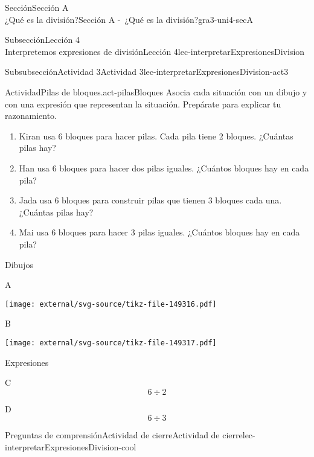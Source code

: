 \begin{sectionptx}{Sección}{{\Large Sección A\\}¿Qué es la división?}{}{Sección A -~¿Qué es la división?}{}{}{gra3-uni4-secA}
\begin{subsectionptx}{Subsección}{{\normalsize Lección 4\\[-0.05cm]}Interpretemos expresiones de división}{}{Lección 4}{}{}{lec-interpretarExpresionesDivision}
\begin{subsubsectionptx}{Subsubsección}{Actividad 3}{}{Actividad 3}{}{}{lec-interpretarExpresionesDivision-act3}
\begin{activity}{Actividad}{Pilas de bloques.}{act-pilasBloques}
Asocia cada situación con un dibujo y con una expresión que representan la situación. Prepárate para explicar tu razonamiento.%
%
\begin{enumerate}
\item{}Kiran usa 6 bloques para hacer pilas. Cada pila tiene 2 bloques. ¿Cuántas pilas hay?%
\item{}Han usa 6 bloques para hacer dos pilas iguales. ¿Cuántos bloques hay en cada pila?%
\item{}Jada usa 6 bloques para construir pilas que tienen 3 bloques cada una. ¿Cuántas pilas hay?%
\item{}Mai usa 6 bloques para hacer 3 pilas iguales. ¿Cuántos bloques hay en cada pila?%
\end{enumerate}
Dibujos%
\begin{sidebyside}{2}{0.05}{0.05}{0.1}%
\begin{sbspanel}{0.4}%
A%
\par
\texttt{[image: external/svg-source/tikz-file-149316.pdf]}
\end{sbspanel}%
\begin{sbspanel}{0.4}%
B%
\par
\texttt{[image: external/svg-source/tikz-file-149317.pdf]}
\end{sbspanel}%
\end{sidebyside}%
\par
Expresiones%
\begin{sidebyside}{2}{0.05}{0.05}{0.1}%
\begin{sbspanel}{0.4}%
C%
\begin{equation*}
6\div 2
\end{equation*}
%
\end{sbspanel}%
\begin{sbspanel}{0.4}%
\par
D%
\begin{equation*}
6\div 3
\end{equation*}
%
\end{sbspanel}%
\end{sidebyside}%
\end{activity}%
\end{subsubsectionptx}
%
%
\typeout{************************************************}
\typeout{************************************************}
%
\begin{reading-questions-subsubsection}{Preguntas de comprensión}{Actividad de cierre}{}{Actividad de cierre}{}{}{lec-interpretarExpresionesDivision-cool}

\end{reading-questions-subsubsection}
\end{subsectionptx}
\end{sectionptx}
